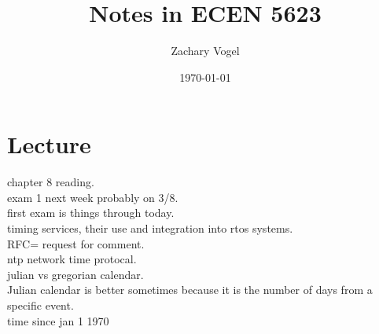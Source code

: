 \documentclass{article}
\author{Zachary Vogel}
\date{\today}
\title{Notes in ECEN 5623}
\begin{document}
\maketitle


\section*{Lecture}
chapter 8 reading.\\
exam 1 next week probably on 3/8.\\
first exam is things through today.\\

timing services, their use and integration into rtos systems.\\

RFC= request for comment.\\
ntp network time protocal.\\
julian vs gregorian calendar.\\

Julian calendar is better sometimes because it is the number of days from a specific event.\\

time since jan 1 1970
\end{document}
